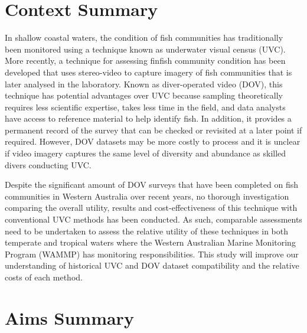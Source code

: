 \documentclass[version=last, paper=a4, DIV=18, usenames, dvipsnames]{scrartcl}
\begin{document}
\setcounter{tocdepth}{2}
\tableofcontents
\clearpage






\section{Context Summary}



In shallow coastal waters, the condition of fish communities has traditionally been monitored using a technique known as underwater visual census (UVC). More recently, a technique for assessing finfish community condition has been developed that uses stereo-video to capture imagery of fish communities that is later analysed in the laboratory. Known as diver-operated video (DOV), this technique has potential advantages over UVC because sampling theoretically requires less scientific expertise, takes less time in the field, and data analysts have access to reference material to help identify fish. In addition, it provides a permanent record of the survey that can be checked or revisited at a later point if required. However, DOV datasets may be more costly to process and it is unclear if video imagery captures the same level of diversity and abundance as skilled divers conducting UVC.


Despite the significant amount of DOV surveys that have been completed on fish communities in Western Australia over recent years, no thorough investigation comparing the overall utility, results and cost-effectiveness of this technique with conventional UVC methods has been conducted. As such, comparable assessments need to be undertaken to assess the relative utility of these techniques in both temperate and tropical waters where the Western Australian Marine Monitoring Program (WAMMP) has monitoring responsibilities. This study will improve our understanding of historical UVC and DOV dataset compatibility and the relative costs of each method.






\section{Aims Summary}
\end{document}
